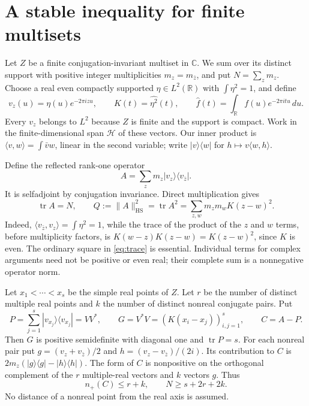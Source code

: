 \documentclass[11pt]{article}
\theoremstyle{remark}
\DeclareMathOperator{\tr}{tr}
\newcommand{\R}{\mathbb R}
\newcommand{\C}{\mathbb C}
\newcommand{\HS}{\mathrm{HS}}
\begin{document}
\section{A stable inequality for finite multisets}

Let $Z$ be a finite conjugation-invariant multiset in $\C$. We sum over its
distinct support with positive integer multiplicities $m_z=m_{\bar z}$,
and put $N=\sum_zm_z$. Choose a real even compactly supported
$\eta\in L^2(\R)$ with $\int\eta^2=1$, and define
\[
 v_z(u)=\eta(u)e^{-2\pi izu},\qquad
 K(t)=\widehat{\eta^2}(t),\qquad
 \widehat f(t)=\int_{\R}f(u)e^{-2\pi itu}\,du.
\]
Every $v_z$ belongs to $L^2$ because $Z$ is finite and the support is compact.
Work in the finite-dimensional span $\mathcal H$ of these vectors. Our inner product
is $\langle v,w\rangle=\int\bar v w$, linear in the second variable; write
$|v\rangle\langle w|$ for $h\mapsto v\langle w,h\rangle$.

Define the reflected rank-one operator
\begin{equation}\label{eq:operator}
 A=\sum_zm_z|v_z\rangle\langle v_{\bar z}|.
\end{equation}
It is selfadjoint by conjugation invariance. Direct multiplication gives
\begin{equation}\label{eq:trace}
 \tr A=N,\qquad
 Q:=\|A\|_{\HS}^2=\tr A^2
   =\sum_{z,w}m_zm_wK(z-w)^2.
\end{equation}
Indeed, $\langle v_{\bar z},v_z\rangle=\int\eta^2=1$, while the trace
of the product of the $z$ and $w$ terms, before multiplicity factors, is
$K(w-z)K(z-w)=K(z-w)^2$, since $K$ is even. The ordinary square in
\eqref{eq:trace} is essential. Individual terms for complex arguments need
not be positive or even real; their complete sum is a nonnegative operator
norm.

Let $x_1<\cdots<x_s$ be the simple real points of $Z$. Let $r$ be the
number of distinct multiple real points and $k$ the number of distinct
nonreal conjugate pairs. Put
\[
 P=\sum_{j=1}^s|v_{x_j}\rangle\langle v_{x_j}|=VV^*,\qquad
 G=V^*V=(K(x_i-x_j))_{i,j=1}^s,\qquad C=A-P.
\]
Then $G$ is positive semidefinite with diagonal one and $\tr P=s$.
For each nonreal pair put
$g=(v_z+v_{\bar z})/2$ and $h=(v_z-v_{\bar z})/(2i)$. Its contribution
to $C$ is $2m_z(|g\rangle\langle g|-|h\rangle\langle h|)$.
The form of $C$ is nonpositive on the orthogonal complement of the $r$
multiple-real vectors and $k$ vectors $g$. Thus
\begin{equation}\label{eq:inertia}
 n_+(C)\le r+k,\qquad N\ge s+2r+2k.
\end{equation}
No distance of a nonreal point from the real axis is assumed.
\end{document}
